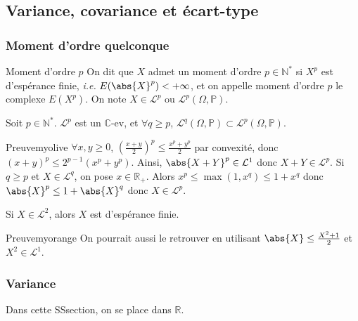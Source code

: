 \subsection{Variance, covariance et écart-type}

    \subsubsection{Moment d’ordre quelconque}

    \begin{defi}{Moment d’ordre $p$}{}
        On dit que $X$ admet un moment d’ordre $p \in \mathbb{N}^*$ si $X^p$ est d’espérance finie, \textit{i.e.} $E(\abs{X}^p) < +\infty$, et on appelle moment d’ordre $p$ le complexe $E(X^p)$. On note $X \in \mathcal{L}^p$ ou $\mathcal{L}^p(\Omega, \mathbb{P})$.
    \end{defi}

    \begin{prop}{}{}
        Soit $p \in \mathbb{N}^*$. $\mathcal{L}^p$ est un $\mathbb{C}$-ev, et $\forall q \geq p$, $\mathcal{L}^q(\Omega,\mathbb{P}) \subset \mathcal{L}^p(\Omega,\mathbb{P})$.
    \end{prop}

    \begin{demo}{Preuve}{myolive}
        $\forall x,y \geq 0$, $\left(\frac{x + y}{2}\right)^p \leq \frac{x^p + y^p}{2}$ par convexité, donc $(x + y)^p \leq 2^{p-1} (x^p + y^p)$. Ainsi, $\abs{X + Y}^p \in \mathcal{L}^1$ donc $X + Y \in \mathcal{L}^p$. Si $q \geq p$ et $X \in \mathcal{L}^q$, on pose $x \in \mathbb{R}_+$. Alors $x^p \leq \max(1, x^q) \leq 1 + x^q$ donc $\abs{X}^p \leq 1 + \abs{X}^q$ donc $X \in \mathcal{L}^p$. 
    \end{demo}

    \begin{coro}{}{}
        Si $X \in \mathcal{L}^2$, alors $X$ est d’espérance finie.
    \end{coro}

    \begin{demo}{Preuve}{myorange}
        On pourrait aussi le retrouver en utilisant $\abs{X} \leq \frac{X^2 + 1}{2}$ et $X^2 \in \mathcal{L}^1$.
    \end{demo}

    \subsubsection{Variance}

    Dans cette SSsection, on se place dans $\mathbb{R}$. 

